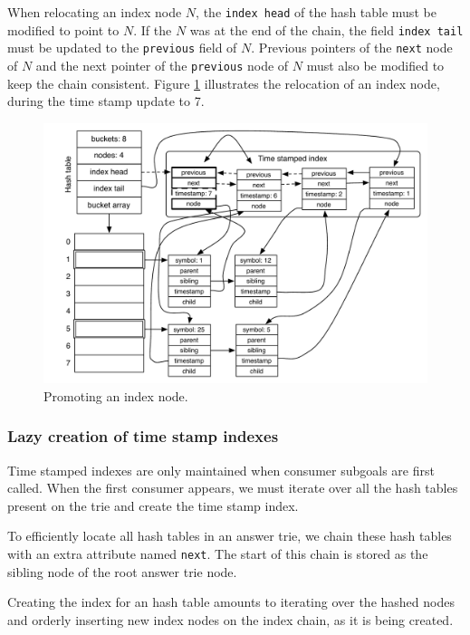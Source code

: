 When relocating an index node $N$, the \texttt{index head} of the hash table must be modified
to point to $N$. If the $N$ was at the end of the chain,
the field \texttt{index tail} must be updated to the \texttt{previous} field of $N$.
Previous pointers of the \texttt{next} node of $N$ and the next pointer of
the \texttt{previous} node of $N$ must
also be modified to keep the chain consistent.
Figure \ref{fig:hash_table_promote} illustrates the relocation of an index node, during
the time stamp update to 7.

\begin{figure}[ht]
  \centering
    \includegraphics[scale=0.6]{hash_table_promote.pdf}
  \caption{Promoting an index node.}
  \label{fig:hash_table_promote}
\end{figure}

\subsubsection{Lazy creation of time stamp indexes}

Time stamped indexes are only maintained when consumer subgoals are first called.
When the first consumer appears, we must iterate over all the hash tables present
on the trie and create the time stamp index.

To efficiently locate all hash tables in an answer trie, we chain these hash tables
with an extra attribute named \texttt{next}. The start of this chain is stored
as the sibling node of the root answer trie node.

Creating the index for an hash table amounts to iterating over the hashed nodes
and orderly inserting new index nodes on the index chain, as it is being created.

